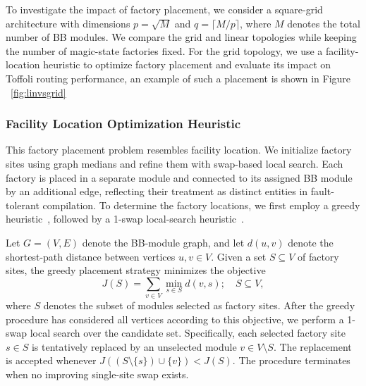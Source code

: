 \documentclass[sigconf]{acmart}
\begin{document}
To investigate the impact of factory placement, we consider a square-grid architecture with dimensions $p = \sqrt{M}$ and $q = \lceil M/p \rceil$, where $M$ denotes the total number of BB modules. We compare the grid and linear topologies while keeping the number of magic-state factories fixed. For the grid topology, we use a facility-location heuristic to optimize factory placement and evaluate its impact on Toffoli routing performance, an example of such a placement is shown in Figure ~\ref{fig:linvsgrid}

\subsubsection{Facility Location Optimization Heuristic}
\label{subsub:floh}
This factory placement problem resembles facility location. We initialize factory sites using graph medians and refine them with swap-based local search. Each factory is placed in a separate module and connected to its assigned BB module by an additional edge, reflecting their treatment as distinct entities in fault-tolerant compilation. To determine the factory locations, we first employ a greedy heuristic~\cite{hakimi1964optimum}, followed by a 1-swap local-search heuristic~\cite{teitz1968heuristic}.

Let $G=(V, E)$ denote the BB-module graph, and let $d(u,v)$ denote the shortest-path distance between vertices $u,v\in V$. Given a set $S\subseteq V$ of factory sites, the greedy placement strategy minimizes the objective
$$J(S) = \sum_{v \in V} \min_{s\in S}d(v,s); \quad S \subseteq V,$$
where $S$ denotes the subset of modules selected as factory sites. After the greedy procedure has considered all vertices according to this objective, we perform a 1-swap local search over the candidate set. Specifically, each selected factory site $s \in S$ is tentatively replaced by an unselected module $v \in V \setminus S$. The replacement is accepted whenever $J\!\left((S \setminus \{s\}) \cup \{v\}\right) < J(S).$
The procedure terminates when no improving single-site swap exists.


\end{document}
